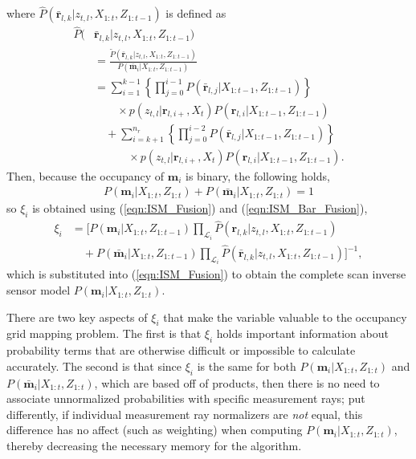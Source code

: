 \documentclass[letterpaper, 10pt, conference]{ieeeconf}
\newcommand{\refeqn}[1]{(\ref{eqn:#1})}
\begin{document}
where $\hat P(\bar{\mathbf{r}}_{l,k}|z_{t,l},X_{1:t},Z_{1:t-1})$ is defined as
\begin{align}
\hat P(&\bar{\mathbf{r}}_{l,k}|z_{t,l},X_{1:t},Z_{1:t-1})\nonumber\\
&=\frac{\tilde P(\bar{\mathbf{r}}_{l,k}|z_{t,l},X_{1:t},Z_{1:t-1})}{P(\bar{\mathbf{m}}_i|X_{1:t},Z_{1:t-1})}
\nonumber\\
&=\sum_{i=1}^{k-1}\left\{\prod_{j=0}^{i-1}P(\bar{\mathbf{r}}_{l,j}|X_{1:t-1},Z_{1:t-1})\right\}\nonumber\\&\quad\quad\times p(z_{t,l}|\mathbf{r}_{l,i+},X_t)P(\mathbf{r}_{l,i}|X_{1:t-1},Z_{1:t-1})
\nonumber
\\
&\quad
+
\sum_{i=k+1}^{n_r}\left\{\prod_{j=0}^{i-2}P(\bar{\mathbf{r}}_{l,j}|X_{1:t-1},Z_{1:t-1})\right\}\nonumber\\&\quad\qquad\times p(z_{t,l}|\mathbf{r}_{l,i+},X_t)P(\mathbf{r}_{l,i}|X_{1:t-1},Z_{1:t-1}).
\end{align}
Then, because the occupancy of $\mathbf{m}_i$ is binary, the following holds,
\begin{align}
P(\mathbf{m}_i|X_{1:t},Z_{1:t})+P(\bar{\mathbf{m}}_i|X_{1:t},Z_{1:t})=1
\end{align}
so $\xi_i$ is obtained using \refeqn{ISM_Fusion} and \refeqn{ISM_Bar_Fusion},
\begin{align}
\xi_i&=
\bigg[
P(\mathbf{m}_i|X_{1:t},Z_{1:t-1})
\prod_{\mathcal L_i}
\hat P(\mathbf{r}_{l,k}|z_{t,l},X_{1:t},Z_{1:t-1})
\nonumber\\&\quad
+
P(\bar{\mathbf{m}}_i|X_{1:t},Z_{1:t-1})
\prod_{\mathcal L_i}
\hat P(\bar{\mathbf{r}}_{l,k}|z_{t,l},X_{1:t},Z_{1:t-1})
\bigg]^{-1},
\end{align}
which is substituted into \refeqn{ISM_Fusion} to obtain the complete scan inverse sensor model $P(\mathbf{m}_i|X_{1:t},Z_{1:t})$.

There are two key aspects of $\xi_i$ that make the variable valuable to the occupancy grid mapping problem.
The first is that $\xi_i$ holds important information about probability terms that are otherwise difficult or impossible to calculate accurately.
The second is that since $\xi_i$ is the same for both $P(\mathbf{m}_i|X_{1:t},Z_{1:t})$ and $P(\bar{\mathbf{m}}_i|X_{1:t},Z_{1:t})$, which are based off of products, then there is no need to associate unnormalized probabilities with specific measurement rays; put differently, if individual measurement ray normalizers are \emph{not} equal, this difference has no affect (such as weighting) when computing $P(\mathbf{m}_i|X_{1:t},Z_{1:t})$, thereby decreasing the necessary memory for the algorithm.
\end{document}

